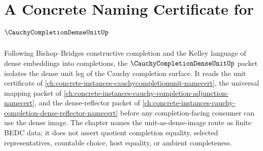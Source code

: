 \chapter{A Concrete Naming Certificate for $\CauchyCompletionDenseUnitUp$}
\label{ch:concrete-instances-cauchy-completion-dense-unit-namecert}

Following Bishop--Bridges constructive completion and the Kelley language of dense embeddings into completions, the $\CauchyCompletionDenseUnitUp$ packet isolates the dense unit leg of the Cauchy completion surface. It reads the unit certificate of \autoref{ch:concrete-instances-cauchycompletionunit-namecert}, the universal mapping packet of \autoref{ch:concrete-instances-cauchy-completion-adjunction-namecert}, and the dense-reflector packet of \autoref{ch:concrete-instances-cauchy-completion-dense-reflector-namecert} before any completion-facing consumer can use the dense image. The chapter names the unit-as-dense-image route as finite BEDC data; it does not assert quotient completion equality, selected representatives, countable choice, host equality, or ambient completeness.

